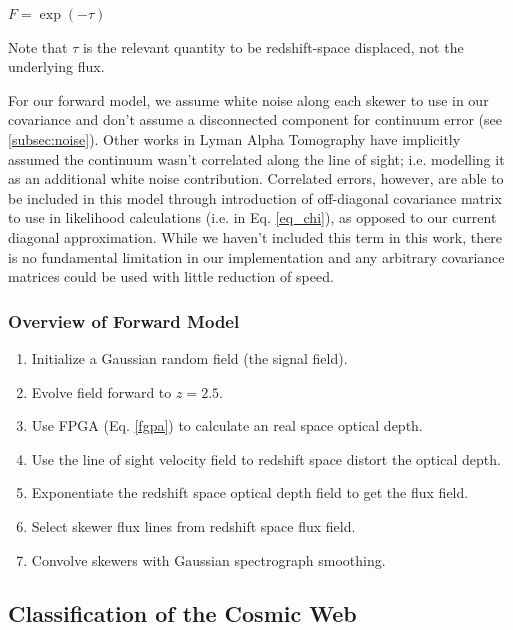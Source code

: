 \documentclass[usenatbib,onecolumn]{mnras}
\begin{document}
$F = \exp\left(-\tau\right)$

Note that $\tau$ is the relevant quantity to be redshift-space displaced, not the underlying flux. 


For our forward model, we assume white noise along each skewer to use in our covariance and don't assume a disconnected component for continuum error (see \ref{subsec:noise}). Other works in Lyman Alpha Tomography have implicitly assumed the continuum wasn't correlated along the line of sight; i.e. modelling it as an additional white noise contribution. Correlated errors, however, are able to be included in this model through introduction of off-diagonal covariance matrix to use in likelihood calculations (i.e. in Eq. \ref{eq_chi}), as opposed to our current diagonal approximation. While we haven't included this term in this work, there is no fundamental limitation in our implementation and any arbitrary covariance matrices could be used with little reduction of speed. 

\subsubsection{Overview of Forward Model}

\begin{enumerate}
\item Initialize a Gaussian random field (the signal field).
\item Evolve field forward to $z = 2.5$.
\item Use FPGA (Eq. \ref{fgpa}) to calculate an real space optical depth.
\item Use the line of sight velocity field to redshift space distort the optical depth.
\item Exponentiate the redshift space optical depth field to get the flux field.
\item Select skewer flux lines from redshift space flux field.
\item Convolve skewers with Gaussian spectrograph smoothing.
\end{enumerate}

\subsection{Classification of the Cosmic Web}
\end{document}
